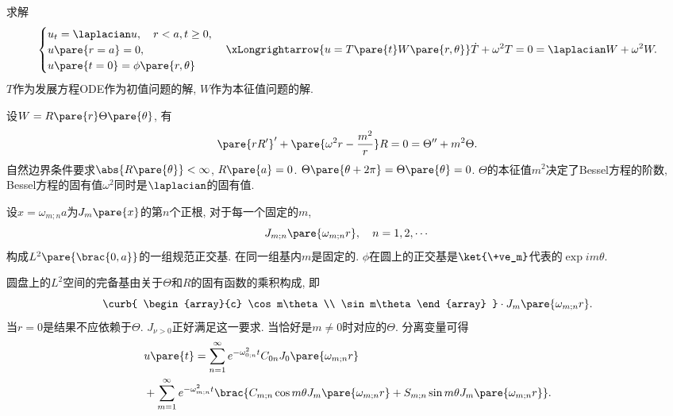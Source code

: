 \documentclass[hidelinks]{ctexart}
\begin{document}
\begin{sample}
    \begin{ex}
        求解
        \[ \begin{cases}
            u_t = \laplacian u, \quad r<a, t\ge 0, \\
            u\pare{r=a} = 0,\\
            u\pare{t=0} = \phi\pare{r,\theta}
        \end{cases}\xLongrightarrow{u=T\pare{t}W\pare{r,\theta}} \dot{T} + \omega^2 T = 0 = \laplacian W + \omega^2 W. \]
        $T$作为发展方程ODE作为初值问题的解, $W$作为本征值问题的解.
        \par
        设$W = R\pare{r}\Theta\pare{\theta}$, 有
        \[ \pare{rR'}' + \pare{\omega^2 r - \frac{m^2}{r}}R = 0 = \Theta'' + m^2\Theta. \]
        自然边界条件要求$\abs{R\pare{\theta}} < \infty$, $R\pare{a} = 0$. $\Theta\pare{\theta+2\pi} = \Theta\pare{\theta} = 0$. $\Theta$的本征值$m^2$决定了Bessel方程的阶数, Bessel方程的固有值$\omega^2$同时是$\laplacian$的固有值.
        \par
        设$x = \omega_{m;n}a$为$J_m\pare{x}$的第$n$个正根, 对于每一个固定的$m$,
        \[ J_{m;n}\pare{\omega_{m;n}r},\quad n = 1,2,\cdots \]
        构成$L^2\pare{\brac{0,a}}$的一组规范正交基. 在同一组基内$m$是固定的. $\phi$在圆上的正交基是$\ket{\+ve_m}$代表的$\exp im\theta$.
        \par
        圆盘上的$L^2$空间的完备基由关于$\Theta$和$R$的固有函数的乘积构成, 即
        \[ \curb{ \begin{array}{c}
            \cos m\theta \\
            \sin m\theta
        \end{array} } \cdot J_m\pare{\omega_{m;n}r}. \]
        当$r=0$是结果不应依赖于$\Theta$. $J_{\nu > 0}$正好满足这一要求. 当恰好是$m\neq 0$时对应的$\Theta$. 分离变量可得
        \begin{align*}
            & u\pare{t} = \sum_{n=1}^\infty e^{-\omega_{0;n}^2 t}C_{0n} J_0\pare{\omega_{m;n}r} \\
            & + \sum_{m=1}^\infty e^{-\omega_{m;n}^2 t}\brac{C_{m;n} \cos m\theta J_m\pare{\omega_{m;n}r} + S_{m;n} \sin m\theta J_m\pare{\omega_{m;n}r}}.
        \end{align*}
    \end{ex}
\end{sample}
\end{document}
